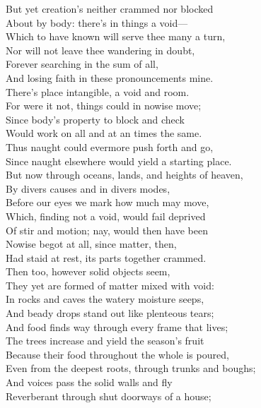 
But yet creation's neither crammed nor blocked\\
About by body: there's in things a void—\\
Which to have known will serve thee many a turn,\\
Nor will not leave thee wandering in doubt,\\
Forever searching in the sum of all,\\
And losing faith in these pronouncements mine.\\
There's place intangible, a void and room.\\
For were it not, things could in nowise move;\\
Since body's property to block and check\\
Would work on all and at an times the same.\\
Thus naught could evermore push forth and go,\\
Since naught elsewhere would yield a starting place.\\
But now through oceans, lands, and heights of heaven,\\
By divers causes and in divers modes,\\
Before our eyes we mark how much may move,\\
Which, finding not a void, would fail deprived\\
Of stir and motion; nay, would then have been\\
Nowise begot at all, since matter, then,\\
Had staid at rest, its parts together crammed.\\
Then too, however solid objects seem,\\
They yet are formed of matter mixed with void:\\
In rocks and caves the watery moisture seeps,\\
And beady drops stand out like plenteous tears;\\
And food finds way through every frame that lives;\\
The trees increase and yield the season's fruit\\
Because their food throughout the whole is poured,\\
Even from the deepest roots, through trunks and boughs;\\
And voices pass the solid walls and fly\\
Reverberant through shut doorways of a house;\\
